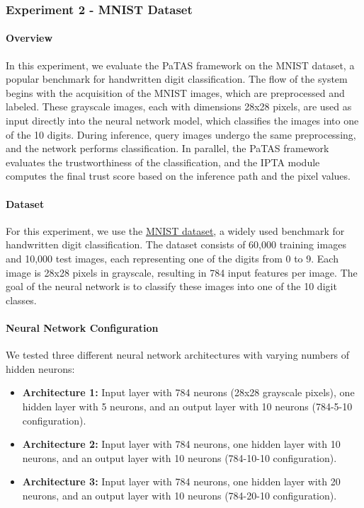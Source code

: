 \subsubsection{Experiment 2 - MNIST Dataset}

\paragraph{Overview}
In this experiment, we evaluate the PaTAS framework on the MNIST dataset, a popular benchmark for handwritten digit classification. The flow of the system begins with the acquisition of the MNIST images, which are preprocessed and labeled. These grayscale images, each with dimensions 28x28 pixels, are used as input directly into the neural network model, which classifies the images into one of the 10 digits. During inference, query images undergo the same preprocessing, and the network performs classification. In parallel, the PaTAS framework evaluates the trustworthiness of the classification, and the IPTA module computes the final trust score based on the inference path and the pixel values.

\paragraph{Dataset}
For this experiment, we use the \href{http://yann.lecun.com/exdb/mnist/}{MNIST dataset}, a widely used benchmark for handwritten digit classification. The dataset consists of 60,000 training images and 10,000 test images, each representing one of the digits from 0 to 9. Each image is 28x28 pixels in grayscale, resulting in 784 input features per image. The goal of the neural network is to classify these images into one of the 10 digit classes.

\paragraph{Neural Network Configuration}
We tested three different neural network architectures with varying numbers of hidden neurons:

\begin{itemize}
    \item \textbf{Architecture 1:} Input layer with 784 neurons (28x28 grayscale pixels), one hidden layer with 5 neurons, and an output layer with 10 neurons (784-5-10 configuration).
    \item \textbf{Architecture 2:} Input layer with 784 neurons, one hidden layer with 10 neurons, and an output layer with 10 neurons (784-10-10 configuration).
    \item \textbf{Architecture 3:} Input layer with 784 neurons, one hidden layer with 20 neurons, and an output layer with 10 neurons (784-20-10 configuration).
\end{itemize}

